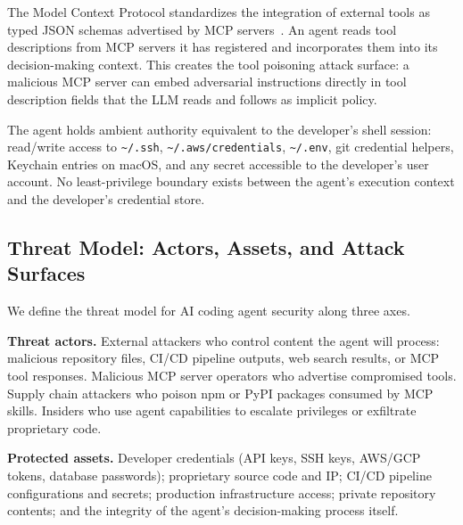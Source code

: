 \documentclass[11pt,letterpaper]{article}
\begin{document}
The Model Context Protocol standardizes the integration of external tools as typed JSON
schemas advertised by MCP servers~\citep{kim2026attack}. An agent reads tool descriptions
from MCP servers it has registered and incorporates them into its decision-making context.
This creates the tool poisoning attack surface: a malicious MCP server can embed
adversarial instructions directly in tool description fields that the LLM reads and
follows as implicit policy.

The agent holds ambient authority equivalent to the developer's shell session: read/write
access to \texttt{\textasciitilde/.ssh}, \texttt{\textasciitilde/.aws/credentials},
\texttt{\textasciitilde/.env}, git credential helpers, Keychain entries on macOS, and
any secret accessible to the developer's user account. No least-privilege boundary exists
between the agent's execution context and the developer's credential store.

\subsection{Threat Model: Actors, Assets, and Attack Surfaces}

We define the threat model for AI coding agent security along three axes.

\textbf{Threat actors.} External attackers who control content the agent will process:
malicious repository files, CI/CD pipeline outputs, web search results, or MCP tool
responses. Malicious MCP server operators who advertise compromised tools. Supply chain
attackers who poison npm or PyPI packages consumed by MCP skills. Insiders who use
agent capabilities to escalate privileges or exfiltrate proprietary code.

\textbf{Protected assets.} Developer credentials (API keys, SSH keys, AWS/GCP tokens,
database passwords); proprietary source code and IP; CI/CD pipeline configurations and
secrets; production infrastructure access; private repository contents; and the integrity
of the agent's decision-making process itself.
\end{document}
